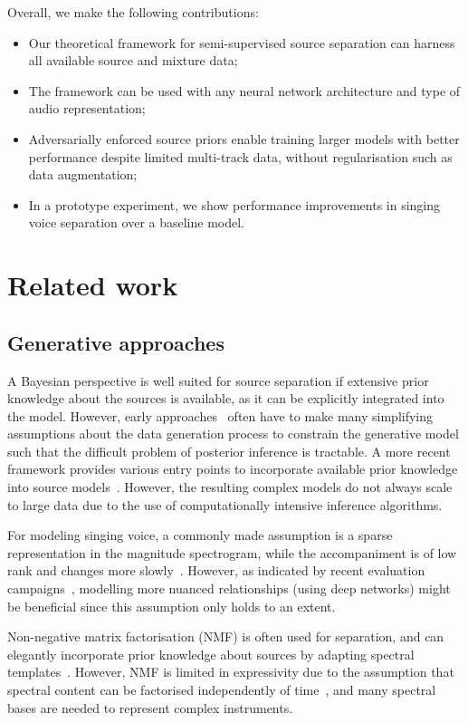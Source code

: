 \documentclass{article}
\begin{document}
Overall, we make the following contributions:
\begin{itemize}
\item{Our theoretical framework for semi-supervised source separation can harness all available source and mixture data;}
\item{The framework can be used with any neural network architecture and type of audio representation;}
\item{Adversarially enforced source priors enable training larger models with better performance despite limited multi-track data, without regularisation such as data augmentation;}
\item{In a prototype experiment, we show performance improvements in singing voice separation over a baseline model.}
\end{itemize}

\section{Related work}
\label{sec:related_work}

\subsection{Generative approaches}
A Bayesian perspective is well suited for source separation if extensive prior knowledge about the sources is available, as it can be explicitly integrated into the model.
However, early approaches~\cite{Fevotte2007,Cemgil2007} often have to make many simplifying assumptions about the data generation process to  constrain the generative model such that the difficult problem of posterior inference is tractable.
A more recent framework provides various entry points to incorporate available prior knowledge into source models~\cite{Ozerov2012}. However, the resulting complex models do not always scale to large data due to the use of  computationally intensive inference algorithms.

For modeling singing voice, a commonly made assumption is a sparse representation in the magnitude spectrogram, while the accompaniment is of low rank and changes more slowly~\cite{Huang2012,Chan2015,Rafii2013a}.
However, as indicated by recent evaluation campaigns~\cite{Liutkus2017}, modelling more nuanced relationships (using deep networks) might be beneficial since this assumption only holds to an extent.

Non-negative matrix factorisation (NMF) is often used for separation, and can elegantly incorporate prior knowledge about sources by adapting spectral templates~\cite{Sun2013}.
However, NMF is limited in expressivity due to the assumption that spectral content can be factorised independently of time~\cite{Ewert2014}, and many spectral bases are needed to represent complex instruments.
\end{document}
